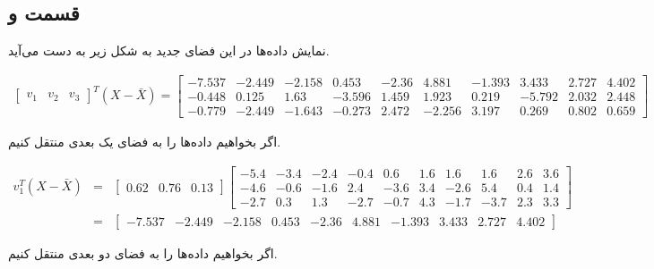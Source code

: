 \documentclass{article}
\begin{document}
\subsection*{قسمت و}

نمایش داده‌ها در این فضای جدید به شکل زیر به دست می‌آید.

\begin{eqnarray*}
    \begin{bmatrix}v_1& v_2& v_3\end{bmatrix}^T (X - \bar{X}) =
    \begin{bmatrix}
        -7.537 & -2.449 & -2.158 & 0.453 & -2.36 &  4.881 & -1.393 & 3.433 & 2.727 & 4.402\\
        -0.448 & 0.125 & 1.63 & -3.596 & 1.459 & 1.923 & 0.219 & -5.792 & 2.032 & 2.448 \\
        -0.779 & -2.449 & -1.643 & -0.273 & 2.472 & -2.256 & 3.197 & 0.269 & 0.802 & 0.659
    \end{bmatrix}
\end{eqnarray*}

اگر بخواهیم داده‌ها را به فضای یک بعدی منتقل کنیم.

\begin{eqnarray*}
    v_1^T (X - \bar{X}) & = & \begin{bmatrix}0.62& 0.76& 0.13\end{bmatrix} \begin{bmatrix}-5.4 & -3.4 & -2.4 & -0.4 & 0.6 & 1.6 & 1.6 & 1.6 & 2.6 & 3.6 \\ -4.6 & -0.6 & -1.6 & 2.4 & -3.6 & 3.4 & -2.6 & 5.4 & 0.4 & 1.4 \\ -2.7 & 0.3 & 1.3 & -2.7 & -0.7 & 4.3 & -1.7 & -3.7 & 2.3 & 3.3\end{bmatrix}\\
    & = & \begin{bmatrix}-7.537 & -2.449 & -2.158 & 0.453 & -2.36 & 4.881 & -1.393 & 3.433 & 2.727 & 4.402\end{bmatrix}
\end{eqnarray*}

اگر بخواهیم داده‌ها را به فضای دو بعدی منتقل کنیم.
\end{document}
